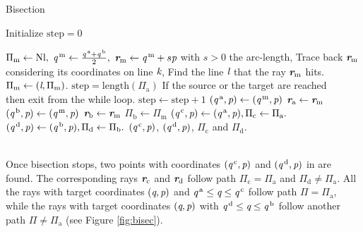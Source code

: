\begin{algorithm}
\caption{Bisection}\label{alg:bisection}
Initialize $\textrm{step} = 0$
\begin{algorithmic}[1]
\State $\Pi_{\textrm{m}}\gets \textrm{Nl},$
\State $\textit{q}^{\,\textrm{m}}\gets \frac{\textit{q}^{\,\textrm{a}}+\textit{q}^{\,\textrm{b}}}{2},$ 
\State $\textit{\textbf{r}}_{\textrm{m}}\gets \textit{q}^{\,\textrm{m}}+s \textit{p}$ with $s>0$ the arc-length,
\State Trace back $\textit{\textbf{r}}_{\textrm{m}}$ considering its coordinates on line $\textit{k}$,
\State Find the line $\textit{l}$ that the ray $\textit{\textbf{r}}_{\textrm{m}}$ hits.
\State $\Pi_{\textrm{m}}\gets (\textit{l},\Pi_{\textrm{m}})$.
\State $\textrm{step} = \mbox{length}(\Pi_\textrm{a})$ \Comment If the source or the target are reached \\  \Comment then exit from the while loop.
\Else \State $\textrm{step}\gets\textrm{step}+1$ 
\EndIf
\EndWhile
{}
\State $(\textit{q}^{\,\textrm{a}}, \textit{p})\gets (\textit{q}^{\,\textrm{m}}, \textit{p})$
\State $\textit{\textbf{r}}_{\textrm{a}}\gets \textit{\textbf{r}}_{\textrm{m}}$
\Else 
\State $(\textit{q}^{\,\textrm{b}}, \textit{p})\gets (\textit{q}^{\,\textrm{m}}, \textit{p})$
\State $\textit{\textbf{r}}_{\textrm{b}}\gets \textit{\textbf{r}}_{\textrm{m}}$
\State $\Pi_\textrm{b}\gets \Pi_{\textrm{m}}$
\EndIf
\EndWhile
\State $(\textit{q}^{\,\textrm{c}}, \textit{p})\gets (\textit{q}^{\,\textrm{a}}, \textit{p}), \Pi_\textrm{c}\gets \Pi_{\textrm{a}}.$
\State $(\textit{q}^{\,\textrm{d}}, \textit{p})\gets (\textit{q}^{\,\textrm{b}}, \textit{p}), \Pi_\textrm{d}\gets \Pi_{\textrm{b}}.$
\State \Return $(\textit{q}^{\,\textrm{c}}, \textit{p})$, $(\textit{q}^{\,\textrm{d}}, \textit{p})$, $\Pi_{\textrm{c}}$ and $\Pi_{\textrm{d}}$.
\end{algorithmic}
\end{algorithm}
\\ \indent Once bisection stops, two points with coordinates $(\textit{q}^{\,\textrm{c}}, \textit{p})$ and $(\textit{q}^{\,\textrm{d}}, \textit{p})$ in  are found. The corresponding rays $\textit{\textbf{r}}_{\textrm{c}}$ and $\textit{\textbf{r}}_{\textrm{d}}$ follow path $\Pi_{\textrm{c}}=\Pi_{\textrm{a}}$ and $\Pi_{\textrm{d}}\neq\Pi_{\textrm{a}}$. 
All the rays with target coordinates $(\textit{q}, \textit{p})$ and $\textit{q}^{\,\textrm{a}}\leq\textit{q}\leq\textit{q}^{\,\textrm{c}}$ follow path $\Pi = \Pi_{\textrm{a}}$, while the rays with target coordinates $(\textit{q}, \textit{p})$ with $\textit{q}^{\,\textrm{d}}\leq\textit{q}\leq\textit{q}^{\,\textrm{b}}$ follow another path $\Pi \neq \Pi_{\textrm{a}}$ (see Figure \ref{fig:bisec}). 
